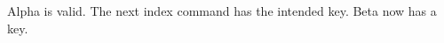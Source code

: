 \documentclass{article}
\begin{document}
Alpha is valid.
The next index command has the intended key.
Beta now has a key.
\printindex
\end{document}
